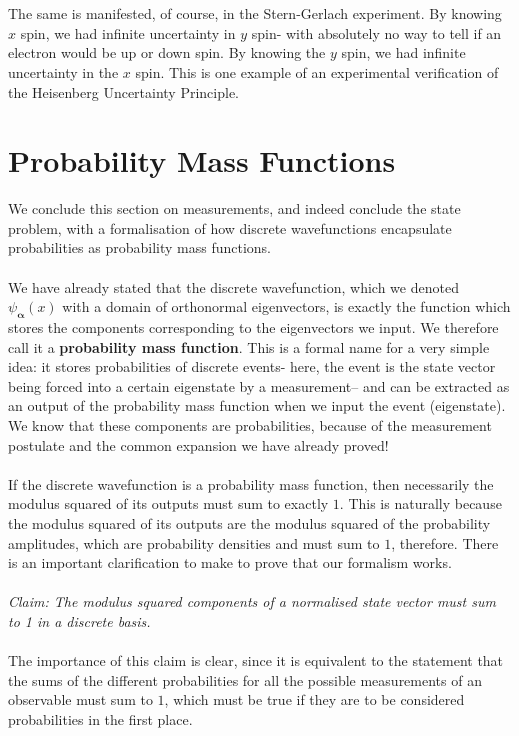\\\\
The same is manifested, of course, in the Stern-Gerlach experiment. By knowing $x$ spin, we had infinite uncertainty in $y$ spin- with absolutely no way to tell if an electron would be up or down spin. By knowing the $y$ spin, we had infinite uncertainty in the $x$ spin. This is one example of an experimental verification of the Heisenberg Uncertainty Principle.
\section{Probability Mass Functions}
We conclude this section on measurements, and indeed conclude the state problem, with a formalisation of how discrete wavefunctions encapsulate probabilities as probability mass functions.
\\\\
We have already stated that the discrete wavefunction, which we denoted ${\psi}_{\bm{\alpha}}(x)$ with a domain of orthonormal eigenvectors, is exactly the function which stores the components corresponding to the eigenvectors we input. We therefore call it a \textbf{probability mass function}. This is a formal name for a very simple idea: it stores probabilities of discrete events- here, the event is the state vector being forced into a certain eigenstate by a measurement-- and can be extracted as an output of the probability mass function when we input the event (eigenstate). We know that these components are probabilities, because of the measurement postulate and the common expansion we have already proved! 
\\\\
If the discrete wavefunction is a probability mass function, then necessarily the modulus squared of its outputs must sum to exactly $1$. This is naturally because the modulus squared of its outputs are the modulus squared of the probability amplitudes, which are probability densities and must sum to $1$, therefore. There is an important clarification to make to prove that our formalism works.
\\\\
\textit{Claim: The modulus squared components of a normalised state vector must sum to 1 in a discrete basis.}
\\\\
The importance of this claim is clear, since it is equivalent to the statement that the sums of the different probabilities for all the possible measurements of an observable must sum to $1$, which must be true if they are to be considered probabilities in the first place.
